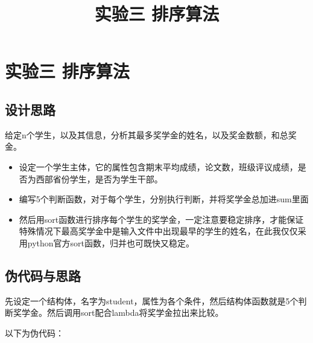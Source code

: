\documentclass[11pt]{article}
\title{实验三 排序算法}
\providecommand{\tightlist}{%
      \setlength{\itemsep}{0pt}\setlength{\parskip}{0pt}}
\begin{document}
    
    \maketitle
    
    

    
    \hypertarget{ux5b9eux9a8cux4e09-ux6392ux5e8fux7b97ux6cd5}{%
\section{实验三
排序算法}\label{ux5b9eux9a8cux4e09-ux6392ux5e8fux7b97ux6cd5}}

\hypertarget{ux8bbeux8ba1ux601dux8def}{%
\subsection{设计思路}\label{ux8bbeux8ba1ux601dux8def}}

给定n个学生，以及其信息，分析其最多奖学金的姓名，以及奖金数额，和总奖金。

\begin{itemize}
\tightlist
\item
  设定一个学生主体，它的属性包含期末平均成绩，论文数，班级评议成绩，是否为西部省份学生，是否为学生干部。
\item
  编写5个判断函数，对于每个学生，分别执行判断，并将奖学金总加进sum里面
\item
  然后用sort函数进行排序每个学生的奖学金，一定注意要稳定排序，才能保证特殊情况下最高奖学金中是输入文件中出现最早的学生的姓名，在此我仅仅采用python官方sort函数，归并也可既快又稳定。
\end{itemize}

\hypertarget{ux4f2aux4ee3ux7801ux4e0eux601dux8def}{%
\subsection{伪代码与思路}\label{ux4f2aux4ee3ux7801ux4e0eux601dux8def}}

先设定一个结构体，名字为student，属性为各个条件，然后结构体函数就是5个判断奖学金。然后调用sort配合lambda将奖学金拉出来比较。

以下为伪代码：
\end{document}
